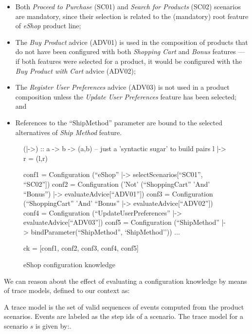 \documentclass{acm_proc_article-sp}
\begin{document}
\begin{itemize}  
\item Both \emph{Proceed to Purchase} (SC01) and \emph{Search for Products}
(SC02) scenarios are mandatory, since their selection is related to the
(mandatory) root feature of \emph{eShop} product line;

\item The \emph{Buy Product} advice (ADV01) is used in the composition of
products that do not have been configured with both \emph{Shopping Cart} and \emph{Bonus}
features --- if both features were selected for a product, it would be configured
with the \emph{Buy Product with Cart} advice (ADV02);

\item The \emph{Register User Preferences} advice (ADV03) is not used in a
product composition unless the \emph{Update User Preferences} feature has been
selected; and
 
\item References to the ``ShipMethod'' parameter are bound to the
selected alternatives of \emph{Ship Method} feature.

\end{itemize}  

\begin{figure}[hbt] 
 \begin{code}
  (|->) :: a -> b -> (a,b) -- just a 'syntactic sugar' to build pairs
  l |-> r = (l,r)
  
  conf1 = Configuration (``eShop'' |-> selectScenarios[``SC01'', ``SC02''])
  conf2 = Configuration ('Not' (``ShoppingCart'' 'And' ``Bonus'') |-> evaluateAdvice[``ADV01''])
  conf3 = Configuration (``ShoppingCart'' 'And' ``Bonus'' |-> evaluateAdvice[``ADV02''])
  conf4 = Configuration (``UpdateUserPreferences'' |-> evaluateAdvice[``ADV03''])
  conf5 = Configuration (``ShipMethod'' |-> bindParameter(``ShipMethod'', `ShipMethod'')) 
  ...
  
  ck = [conf1, conf2, conf3, conf4, conf5]
 \end{code}
\caption{eShop configuration knowledge} 
\label{fig:ck-running-example}
\end{figure}

We can reason about the effect of evaluating a configuration knowledge
by means of trace models, defined to our context as:


\begin{definition}
A trace model is the set of valid sequences of events
computed from the product scenarios. Events are labeled as the step ids of a
scenario. The trace model for a scenario $s$ is given by:.
\end{definition}
\end{document}

